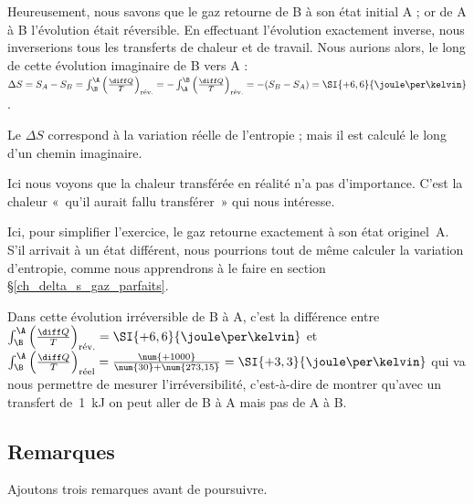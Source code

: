 \begin{anexample}
\begin{answer}
				Heureusement, nous savons que le gaz retourne de B à son état initial A ; or de A à B l’évolution était réversible. En effectuant l’évolution exactement inverse, nous inverserions tous les transferts de chaleur et de travail. Nous aurions alors, le long de cette évolution imaginaire de B vers A : $\Delta S = S_A - S_B
					= \int_\B^\A \left( \frac{\diff Q}{T} \right)_\text{rév.}
					= - \int_\A^\B \left( \frac{\diff Q}{T} \right)_\text{rév.}
					= -(S_B - S_A)
					= \SI{+6,6}{\joule\per\kelvin}$.
						\begin{remark}Le $\Delta S$ correspond à la variation réelle de l’entropie ; mais il est calculé le long d’un chemin imaginaire.\end{remark}
						\begin{remark} Ici nous voyons que la chaleur transférée en réalité n’a pas d’importance. C’est la chaleur «~qu’il aurait fallu transférer~» qui nous intéresse.\end{remark}
						\begin{remark} Ici, pour simplifier l’exercice, le gaz retourne exactement à son état originel~A. S’il arrivait à un état différent, nous pourrions tout de même calculer la variation d’entropie, comme nous apprendrons à le faire en section \S\ref{ch_delta_s_gaz_parfaits}.\end{remark}
						\begin{remark}Dans cette évolution irréversible de B à A, c’est la différence entre $\int_\B^\A \left( \frac{\diff Q}{T} \right)_\text{rév.} = \SI{+6,6}{\joule\per\kelvin}$ et $\int_\B^\A \left( \frac{\diff Q}{T} \right)_\text{réel} = \frac{\num{+1000}}{\num{30}+\num{273,15}} =  \SI{+3,3}{\joule\per\kelvin}$ qui va nous permettre de mesurer l’irréversibilité, c’est-à-dire de montrer qu’avec un transfert de~\SI{1}{\kilo\joule} on peut aller de B à A mais pas de A à B.\end{remark}
				\end{answer}
		\end{anexample}

		
	\subsection{Remarques}
	
		Ajoutons trois remarques avant de poursuivre.
		
